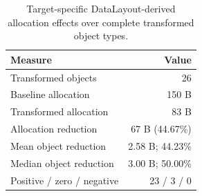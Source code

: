 \begin{table}[t]
\centering
\caption{Target-specific DataLayout-derived allocation effects over complete transformed object types.}
\label{tab:allocation-summary}
\small
\begin{tabular}{lr}
\toprule
Measure & Value \\
\midrule
Transformed objects & 26 \\
Baseline allocation & 150 B \\
Transformed allocation & 83 B \\
Allocation reduction & 67 B (44.67\%) \\
Mean object reduction & 2.58 B; 44.23\% \\
Median object reduction & 3.00 B; 50.00\% \\
Positive / zero / negative & 23 / 3 / 0 \\
\bottomrule
\end{tabular}
\end{table}
